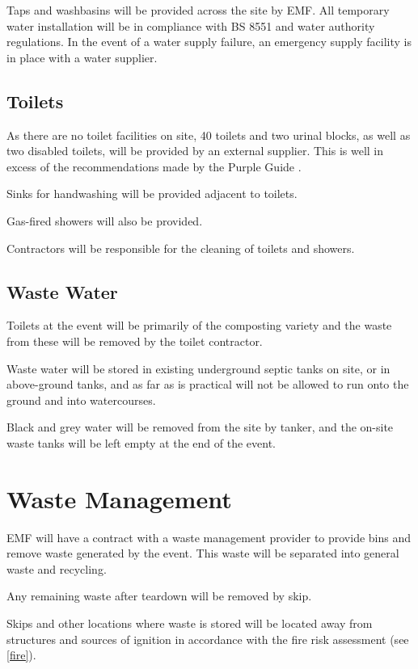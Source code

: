 Taps and washbasins will be provided across the site by EMF\@.
All temporary water installation will be in compliance with BS 8551 \cite{bs8551} and water authority regulations.
In the event of a water supply failure, an emergency supply facility is in place with a water supplier.

\subsection{Toilets}

As there are no toilet facilities on site, 40 toilets and two urinal blocks,
as well as two disabled toilets, will be provided by an external supplier. This
is well in excess of the recommendations made by the Purple Guide \cite{purpleguide}.

Sinks for handwashing will be provided adjacent to toilets.

Gas-fired showers will also be provided.

Contractors will be responsible for the cleaning of toilets and showers.

\subsection{Waste Water}

Toilets at the event will be primarily of the composting variety and the waste from these will be
removed by the toilet contractor.

Waste water will be stored in existing underground septic tanks on site, or in above-ground tanks,
and as far as is practical will not be allowed to run onto the ground and into watercourses.

Black and grey water will be removed from the site by tanker, and the on-site waste tanks
will be left empty at the end of the event.

\section{Waste Management}
EMF will have a contract with a waste management provider to provide bins and remove waste
generated by the event. This waste will be separated into general waste and recycling.

Any remaining waste after teardown will be removed by skip.

Skips and other locations where waste is stored will be located away from structures and
sources of ignition in accordance with the fire risk assessment (see \cref{fire}).

